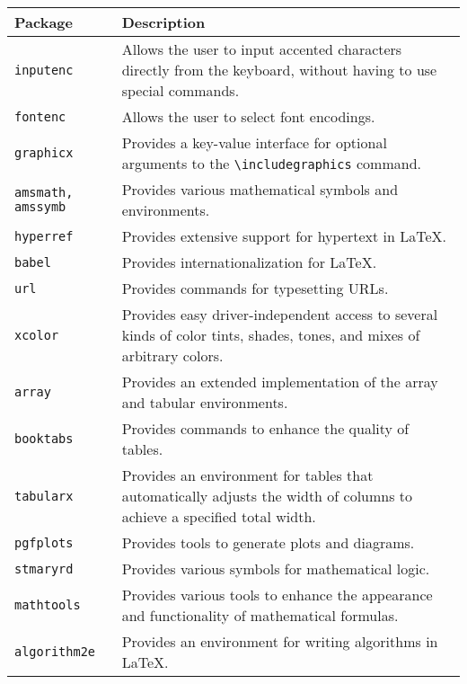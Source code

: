 \documentclass[11pt]{report}
\begin{document}
	\noindent\begin{tabularx}{\linewidth}{|X|X|}
		\hline
		\textbf{Package}        & \textbf{Description}                                                                                                   \\
		\hline
		\verb|inputenc|         & Allows the user to input accented characters directly from the keyboard, without having to use special commands.       \\
		\hline
		\verb|fontenc|          & Allows the user to select font encodings.                                                                              \\
		\hline
		\verb|graphicx|         & Provides a key-value interface for optional arguments to the \verb|\includegraphics| command.                          \\
		\hline
		\verb|amsmath, amssymb| & Provides various mathematical symbols and environments.                                                                \\
		\hline
		\verb|hyperref|         & Provides extensive support for hypertext in LaTeX.                                                                     \\
		\hline
		\verb|babel|            & Provides internationalization for LaTeX.                                                                               \\
		\hline
		\verb|url|              & Provides commands for typesetting URLs.                                                                                \\
		\hline
		\verb|xcolor|           & Provides easy driver-independent access to several kinds of color tints, shades, tones, and mixes of arbitrary colors. \\
		\hline
		\verb|array|            & Provides an extended implementation of the array and tabular environments.                                             \\
		\hline
		\verb|booktabs|         & Provides commands to enhance the quality of tables.                                                                    \\
		\hline
		\verb|tabularx|         & Provides an environment for tables that automatically adjusts the width of columns to achieve a specified total width. \\
		\hline
		\verb|pgfplots|         & Provides tools to generate plots and diagrams.                                                                         \\
		\hline
		\verb|stmaryrd|         & Provides various symbols for mathematical logic.                                                                       \\
		\hline
		\verb|mathtools|        & Provides various tools to enhance the appearance and functionality of mathematical formulas.                           \\
		\hline
		\verb|algorithm2e|      & Provides an environment for writing algorithms in LaTeX.                                                               \\
	\end{tabularx}
\end{document}

